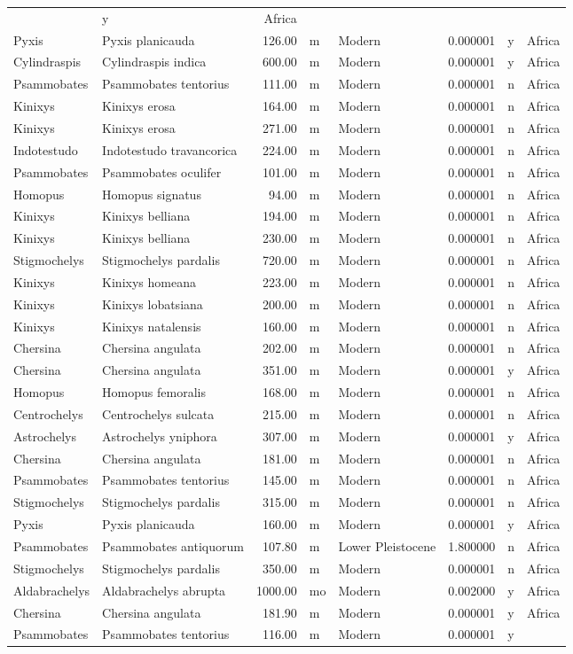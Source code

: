 \begin{landscape}
\begin{longtable}[]{@{}llrllrll@{}}
	& y & Africa\tabularnewline
	Pyxis & Pyxis planicauda & 126.00 & m & Modern & 0.000001 & y &
	Africa\tabularnewline
	Cylindraspis & Cylindraspis indica & 600.00 & m & Modern & 0.000001 & y
	& Africa\tabularnewline
	Psammobates & Psammobates tentorius & 111.00 & m & Modern & 0.000001 & n
	& Africa\tabularnewline
	Kinixys & Kinixys erosa & 164.00 & m & Modern & 0.000001 & n &
	Africa\tabularnewline
	Kinixys & Kinixys erosa & 271.00 & m & Modern & 0.000001 & n &
	Africa\tabularnewline
	Indotestudo & Indotestudo travancorica & 224.00 & m & Modern & 0.000001
	& n & Africa\tabularnewline
	Psammobates & Psammobates oculifer & 101.00 & m & Modern & 0.000001 & n
	& Africa\tabularnewline
	Homopus & Homopus signatus & 94.00 & m & Modern & 0.000001 & n &
	Africa\tabularnewline
	Kinixys & Kinixys belliana & 194.00 & m & Modern & 0.000001 & n &
	Africa\tabularnewline
	Kinixys & Kinixys belliana & 230.00 & m & Modern & 0.000001 & n &
	Africa\tabularnewline
	Stigmochelys & Stigmochelys pardalis & 720.00 & m & Modern & 0.000001 &
	n & Africa\tabularnewline
	Kinixys & Kinixys homeana & 223.00 & m & Modern & 0.000001 & n &
	Africa\tabularnewline
	Kinixys & Kinixys lobatsiana & 200.00 & m & Modern & 0.000001 & n &
	Africa\tabularnewline
	Kinixys & Kinixys natalensis & 160.00 & m & Modern & 0.000001 & n &
	Africa\tabularnewline
	Chersina & Chersina angulata & 202.00 & m & Modern & 0.000001 & n &
	Africa\tabularnewline
	Chersina & Chersina angulata & 351.00 & m & Modern & 0.000001 & y &
	Africa\tabularnewline
	Homopus & Homopus femoralis & 168.00 & m & Modern & 0.000001 & n &
	Africa\tabularnewline
	Centrochelys & Centrochelys sulcata & 215.00 & m & Modern & 0.000001 & n
	& Africa\tabularnewline
	Astrochelys & Astrochelys yniphora & 307.00 & m & Modern & 0.000001 & y
	& Africa\tabularnewline
	Chersina & Chersina angulata & 181.00 & m & Modern & 0.000001 & n &
	Africa\tabularnewline
	Psammobates & Psammobates tentorius & 145.00 & m & Modern & 0.000001 & n
	& Africa\tabularnewline
	Stigmochelys & Stigmochelys pardalis & 315.00 & m & Modern & 0.000001 &
	n & Africa\tabularnewline
	Pyxis & Pyxis planicauda & 160.00 & m & Modern & 0.000001 & y &
	Africa\tabularnewline
	Psammobates & Psammobates antiquorum & 107.80 & m & Lower Pleistocene &
	1.800000 & n & Africa\tabularnewline
	Stigmochelys & Stigmochelys pardalis & 350.00 & m & Modern & 0.000001 &
	n & Africa\tabularnewline
	Aldabrachelys & Aldabrachelys abrupta & 1000.00 & mo & Modern & 0.002000
	& y & Africa\tabularnewline
	Chersina & Chersina angulata & 181.90 & m & Modern & 0.000001 & y &
	Africa\tabularnewline
	Psammobates & Psammobates tentorius & 116.00 & m & Modern & 0.000001 & y

\end{longtable}
\end{landscape}
